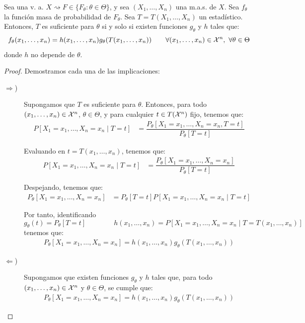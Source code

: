 \begin{teo}
    Sea una v. a. $X\rightsquigarrow F\in \{F_\theta : \theta\in\Theta\}$, y sea $(X_1, \ldots, X_n)$ una m.a.s. de $X$. Sea $f_\theta$ la función masa de probabilidad de $F_\theta$. Sea $T = T(X_1, \ldots, X_n)$ un estadístico. Entonces, $T$ es suficiente para $\theta$ si y solo si existen funciones $g_\theta$ y $h$ tales que:
    \begin{equation*}
        f_\theta(x_1, \ldots, x_n) = h(x_1, \ldots, x_n) g_\theta(T(x_1, \ldots, x_n)) \qquad \forall (x_1, \ldots, x_n)\in\mathcal{X}^n,\ \forall \theta\in\Theta
    \end{equation*}
    donde $h$ no depende de $\theta$.
    \begin{proof} Demostramos cada una de las implicaciones:
    \begin{description}
        \item[$\Longrightarrow$)] Supongamos que $T$ es suficiente para $\theta$. Entonces, para todo $(x_1, \ldots, x_n)\in\mathcal{X}^n$, $\theta\in\Theta$, y para cualquier $t\in T(\mathcal{X}^n)$ fijo, tenemos que:
        \begin{align*}
            P[X_1=x_1, \ldots, X_n=x_n\mid T=t] &= \dfrac{P_\theta[X_1=x_1, \ldots, X_n=x_n, T=t]}{P_\theta[T=t]}
        \end{align*}

        Evaluando en $t=T(x_1, \ldots, x_n)$, tenemos que:
        \begin{align*}
            P[X_1=x_1, \ldots, X_n=x_n\mid T=t] &= \dfrac{P_\theta[X_1=x_1, \ldots, X_n=x_n]}{P_\theta[T=t]}
        \end{align*}

        Despejando, tenemos que:
        \begin{align*}
            P_\theta[X_1=x_1, \ldots, X_n=x_n] &= P_\theta[T=t] P[X_1=x_1, \ldots, X_n=x_n\mid T=t]
        \end{align*}

        Por tanto, identificando
        $$g_\theta(t) = P_\theta[T=t]\qquad \qquad h(x_1, \ldots, x_n) = P[X_1=x_1, \ldots, X_n=x_n\mid T=T(x_1, \ldots, x_n)]$$
        tenemos que:
        \begin{align*}
            P_\theta[X_1=x_1, \ldots, X_n=x_n] = h(x_1, \ldots, x_n) g_\theta(T(x_1, \ldots, x_n))
        \end{align*}

        \item[$\Longleftarrow$)] Supongamos que existen funciones $g_\theta$ y $h$ tales que, para todo $(x_1, \ldots, x_n)\in\mathcal{X}^n$ y $\theta\in\Theta$, se cumple que:
        \begin{align*}
            P_\theta[X_1=x_1, \ldots, X_n=x_n] = h(x_1, \ldots, x_n) g_\theta(T(x_1, \ldots, x_n))
        \end{align*}


\end{description}
\end{proof}
\end{teo}
